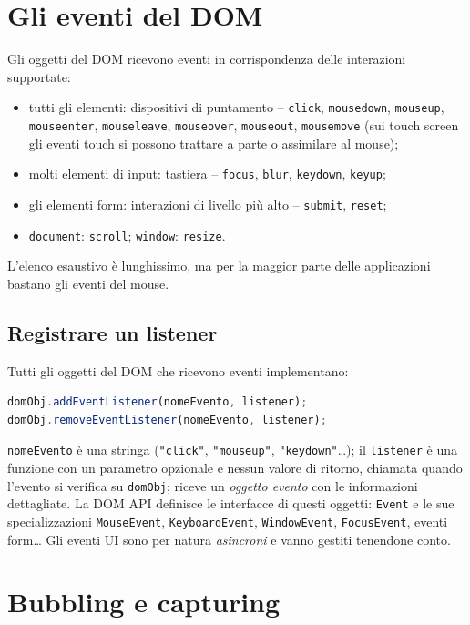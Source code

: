 \section{Gli eventi del DOM}

Gli oggetti del DOM ricevono eventi in corrispondenza delle interazioni supportate:
\begin{itemize}
  \item tutti gli elementi: dispositivi di puntamento -- \texttt{click},
        \texttt{mousedown}, \texttt{mouseup}, \texttt{mouseenter}, \texttt{mouseleave},
        \texttt{mouseover}, \texttt{mouseout}, \texttt{mousemove} (sui touch screen gli
        eventi touch si possono trattare a parte o assimilare al mouse);
  \item molti elementi di input: tastiera -- \texttt{focus}, \texttt{blur},
        \texttt{keydown}, \texttt{keyup};
  \item gli elementi form: interazioni di livello pi\`u alto -- \texttt{submit},
        \texttt{reset};
  \item \texttt{document}: \texttt{scroll}; \texttt{window}: \texttt{resize}.
\end{itemize}
L'elenco esaustivo \`e lunghissimo, ma per la maggior parte delle applicazioni bastano gli
eventi del mouse.

\subsection{Registrare un listener}
Tutti gli oggetti del DOM che ricevono eventi implementano:
\begin{lstlisting}[language=JavaScript]
domObj.addEventListener(nomeEvento, listener);
domObj.removeEventListener(nomeEvento, listener);
\end{lstlisting}
\texttt{nomeEvento} \`e una stringa (\texttt{"click"}, \texttt{"mouseup"},
\texttt{"keydown"}\dots); il \texttt{listener} \`e una funzione con un parametro opzionale e
nessun valore di ritorno, chiamata quando l'evento si verifica su \texttt{domObj}; riceve un
\emph{oggetto evento} con le informazioni dettagliate. La DOM API definisce le interfacce di
questi oggetti: \texttt{Event} e le sue specializzazioni \texttt{MouseEvent},
\texttt{KeyboardEvent}, \texttt{WindowEvent}, \texttt{FocusEvent}, eventi form\dots
Gli eventi UI sono per natura \emph{asincroni} e vanno gestiti tenendone conto.

\section{Bubbling e capturing}

